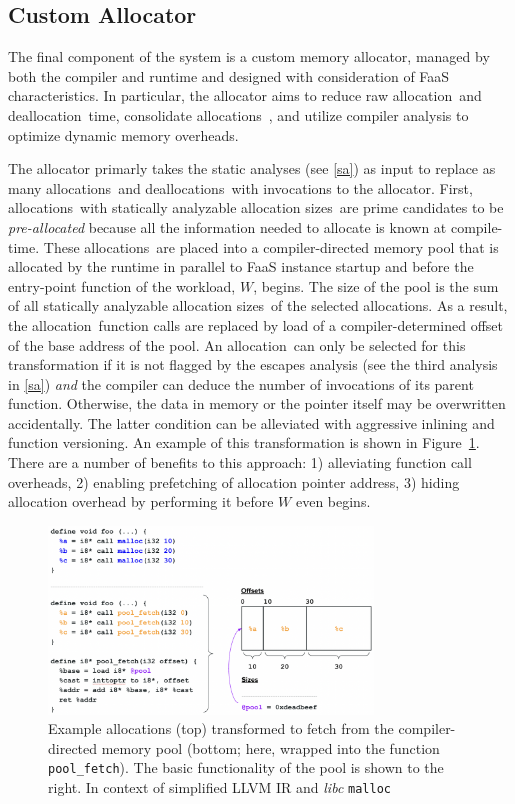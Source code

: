 \documentclass{article}
\def\ALL{allocation}
\def\DALL{deallocation}
\def\ALLS{allocations}
\def\DALLS{deallocations}
\def\SIZES{allocation sizes}
\begin{document}
\subsection{Custom Allocator} \label{ca}
The final component of the system is a custom memory allocator, managed by both
the compiler and runtime and designed with consideration of FaaS characteristics.
In particular, the allocator aims to reduce raw \ALL\ and \DALL\ time, consolidate 
\ALLS\ , and utilize compiler analysis to optimize dynamic memory overheads. 

The allocator primarly takes the static analyses (see \ref{sa})
as input to replace as many \ALLS\ and \DALLS\ with invocations to the allocator. 
First, \ALLS\ with statically analyzable \SIZES\ are prime candidates to be 
\textit{pre-allocated} because all the information needed to allocate is known at
compile-time. These \ALLS\ are placed into a compiler-directed memory pool that is
allocated by the runtime in parallel to FaaS instance startup and before the entry-point function 
of the workload, $W$, begins. The size of the pool is the sum of all statically 
analyzable \SIZES\ of the selected \ALLS . As a result, the \ALL\ function calls are 
replaced by load of a compiler-determined offset of the base address of the pool.
An \ALL\ can only be selected for this transformation if it is not flagged by 
the escapes analysis (see the third analysis in \ref{sa}) \textit{and} the compiler 
can deduce the number of invocations of its parent function. Otherwise, the data
in memory or the pointer itself may be overwritten accidentally. The latter condition
can be alleviated with aggressive inlining and function versioning. An example of 
this transformation is shown in Figure~\ref{fig:pool}. There are a number of 
benefits to this approach: 1) alleviating function call overheads, 2) enabling 
prefetching of allocation pointer address, 3) hiding allocation overhead by performing 
it before $W$ even begins.  

\begin{figure}
    \centering
    \begin{minipage}{0.45\textwidth}
        \centering
        \includegraphics[width=0.77\textwidth]{figs/pool.png} 
        \caption{Example allocations (top) transformed to fetch from the compiler-directed
        memory pool (bottom; here, wrapped into the function \texttt{pool\_fetch}). The 
        basic functionality of the pool is shown to the right. In context of simplified LLVM 
        IR and \textit{libc} \texttt{malloc}}  
	    \label{fig:pool}
    \end{minipage}\hfill
\end{figure}
\end{document}
